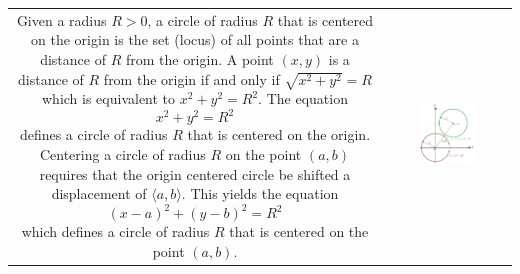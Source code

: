 \documentclass{article}
\begin{document}
\begin{tabular}{cc}
\parbox{0.5\textwidth}{
Given a radius \(R > 0\), a circle of radius \(R\) that is centered on the origin is the set (locus) of all points that are a distance of \(R\) from the origin. A point \((x,y)\) is a distance of \(R\) from the origin if and only if \(\sqrt{x^2 + y^2} = R\) which is equivalent to \(x^2 + y^2 = R^2\). The equation 
\[x^2 + y^2 = R^2\] 
defines a circle of radius \(R\) that is centered on the origin. \\ 
Centering a circle of radius \(R\) on the point \((a,b)\) requires that the origin centered circle be shifted a displacement of \(\langle a, b \rangle\). This yields the equation
\[(x-a)^2 + (y-b)^2 = R^2\] 
which defines a circle of radius \(R\) that is centered on the point \((a,b)\).
} & \parbox{0.5\textwidth}{
\includegraphics[width = 0.5\textwidth]{circle}
}
\end{tabular}
\end{document}
